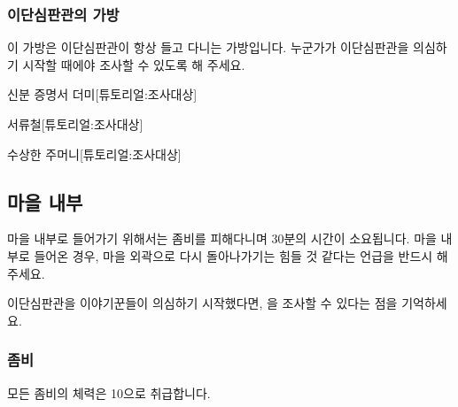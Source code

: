 \documentclass{report}
\begin{document}
				\hypertarget{search:rogue-bag}{}
				\subsubsection*{이단심판관의 가방}
					이 가방은 이단심판관이 항상 들고 다니는 가방입니다. 누군가가 이단심판관을 의심하기 시작할 때에야 조사할 수 있도록 해 주세요.
					
					\begin{spoiler}{신분 증명서 더미}{[튜토리얼:조사대상]}
					\end{spoiler}
					
					\begin{spoiler}{서류철}{[튜토리얼:조사대상]}
						
					\end{spoiler}
					
					\begin{spoiler}{수상한 주머니}{[튜토리얼:조사대상]}
						
					\end{spoiler}
				
			\subsection{마을 내부}
				마을 내부로 들어가기 위해서는 좀비를 피해다니며 30분의 시간이 소요됩니다. 마을 내부로 들어온 경우, 마을 외곽으로 다시 돌아나가기는 힘들 것 같다는 언급을 반드시 해주세요.
				
				이단심판관을 이야기꾼들이 의심하기 시작했다면, 을 조사할 수 있다는 점을 기억하세요.
				
				\hypertarget{search:zombie}{}
				\subsubsection*{좀비}
					모든 좀비의 체력은 10으로 취급합니다.
					
\end{document}
